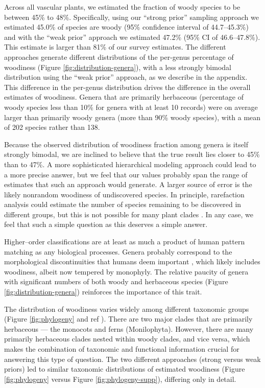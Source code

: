 \documentclass[12pt]{article}
\begin{document}
Across all vascular plants, we estimated the fraction of woody species
to be between 45\% to 48\%.
Specifically, using our ``strong prior'' sampling approach we
estimated 45.0\% of species are woody (95\% confidence interval of
44.7--45.3\%) and with the ``weak prior'' approach we estimated 47.2\%
(95\% CI of 46.6--47.8\%).  This estimate is larger than 81\% of our
survey estimates.
The different approaches generate different distributions of the
per-genus percentage of woodiness (Figure
\ref{fig:distribution-genera}), with a less strongly bimodal
distribution using the ``weak prior'' approach, as we describe in the
appendix.
%
This difference in the per-genus distribution drives the difference in
the overall estimates of woodiness.  Genera that are primarily
herbaceous (percentage of woody species less than 10\% for genera with
at least 10 records) were on average larger than primarily woody
genera (more than 90\% woody species), with a mean of 202 species
rather than 138.

Because the observed distribution of woodiness fraction among genera
is itself strongly bimodal, we are inclined to believe that the true
result lies closer to 45\% than to 47\%.  A more sophisticated
hierarchical modeling approach could lead to a more precise answer,
but we feel that our values probably span the range of estimates that
such an approach would generate.
%
A larger source of error is the likely nonrandom woodiness of
undiscovered species.  In principle, rarefaction analysis could
estimate the number of species remaining to be discovered in different
groups, but this is not possible for many plant clades
\citep{costello2011}.
%
In any case, we feel that such a simple question as this deserves a
simple answer.

Higher--order classifications are at least as much a product of human
pattern matching as any biological processes.  Genera probably
correspond to the morphological discontinuities that humans deem
important \citep{scotland2004significance}, which likely includes
woodiness, albeit now tempered by monophyly.  The relative paucity of
genera with significant numbers of both woody and herbaceous species
(Figure \ref{fig:distribution-genera}) reinforces the importance of
this trait.

The distribution of woodiness varies widely among different taxonomic
groups (Figure \ref{fig:phylogeny} and ref
\citep{sinnott1915evolution}).  There are two major clades that are
primarily herbaceous --- the monocots and ferns
(Monilophyta). However, there are many primarily herbaceous clades
nested within woody clades, and vice versa, which makes the
combination of taxonomic and functional information crucial for
answering this type of question.  The two different approaches (strong
versus weak priors) led to similar taxonomic distributions of
estimated woodiness (Figure \ref{fig:phylogeny} versus Figure
\ref{fig:phylogeny-supp}), differing only in detail.
\end{document}

